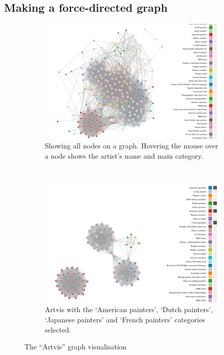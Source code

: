 \documentclass[11pt]{article}
\begin{document}
\subsection{Making a force-directed graph} 
\begin{figure} 
  \centering
  \begin{subfigure}[b]{0.9\textwidth} 
    \includegraphics[width=\textwidth]{artvis1.png} 
    \caption{Showing all nodes on a graph. Hovering the mouse over a node shows the artist's name and main category.} 
    \label{fig:artvis1} 
  \end{subfigure}\\
  \vspace{10mm} \begin{subfigure}[b]{0.9\textwidth}
  \includegraphics[width=\textwidth]{artvis2.png} 
  \caption{Artvis with the `American painters', `Dutch painters', `Japanese painters' and `French painters' categories selected.} 
  \label{fig:artvis2} 
\end{subfigure} 
\caption{The ``Artvis'' graph visualisation}
\label{fig:artvis} 
\end{figure} 
\end{document}
